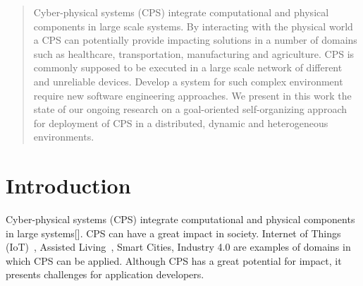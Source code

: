 \documentclass[conference]{IEEEtran}
\begin{document}
\maketitle

\begin{abstract}
Cyber-physical systems (CPS) integrate computational and physical components in large scale systems. By interacting with the physical world a CPS can potentially provide impacting solutions in a number of domains such as healthcare, transportation, manufacturing and agriculture.
CPS is commonly supposed to be executed in a large scale network of different and unreliable devices. Develop a system for such complex environment require new software engineering approaches. We present in this work the state of our ongoing research on a goal-oriented self-organizing approach for deployment of CPS in a distributed, dynamic and heterogeneous environments. 

\end{abstract}





%
\IEEEpeerreviewmaketitle



\section{Introduction}
Cyber-physical systems (CPS) integrate computational and physical components in large systems[]. CPS can have a great impact in society. Internet of Things (IoT)~\cite{atzori_internet_2010}, Assisted Living~\cite{kleinberger_ambient_2007}, Smart Cities, Industry 4.0 are examples of domains in which CPS can be applied. Although CPS has a great potential for impact, it presents challenges for application developers.
\end{document}
